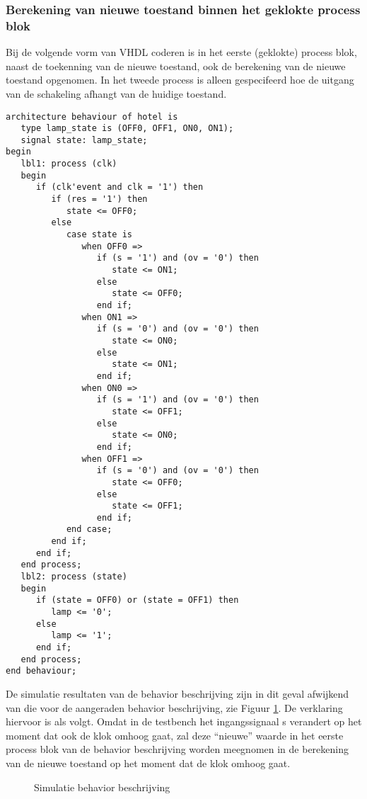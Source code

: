 \subsubsection{Berekening van nieuwe toestand binnen het geklokte process blok}
Bij de volgende vorm van VHDL coderen is in het eerste (geklokte) process blok,
naast de toekenning van de nieuwe toestand, ook de berekening 
van de nieuwe toestand opgenomen.
In het tweede process is alleen gespecifeerd hoe de uitgang
van de schakeling afhangt van de huidige toestand.
\begin{small}
\begin{verbatim}
architecture behaviour of hotel is
   type lamp_state is (OFF0, OFF1, ON0, ON1);
   signal state: lamp_state;
begin
   lbl1: process (clk)
   begin
      if (clk'event and clk = '1') then
         if (res = '1') then
            state <= OFF0;
         else 
            case state is
               when OFF0 =>
                  if (s = '1') and (ov = '0') then
                     state <= ON1; 
                  else
                     state <= OFF0; 
                  end if;
               when ON1 =>
                  if (s = '0') and (ov = '0') then
                     state <= ON0;
                  else
                     state <= ON1;
                  end if;
               when ON0 =>
                  if (s = '1') and (ov = '0') then
                     state <= OFF1; 
                  else
                     state <= ON0; 
                  end if;
               when OFF1 =>
                  if (s = '0') and (ov = '0') then
                     state <= OFF0;
                  else
                     state <= OFF1;
                  end if;
            end case;
         end if;
      end if;
   end process;
   lbl2: process (state) 
   begin
      if (state = OFF0) or (state = OFF1) then
         lamp <= '0';
      else 
         lamp <= '1';
      end if;
   end process;
end behaviour;
\end{verbatim}
\end{small}
De simulatie resultaten van de behavior beschrijving 
zijn in dit geval afwijkend van die voor de
aangeraden behavior beschrijving, zie Figuur \ref{figuur:vhdlsim2}.
De verklaring hiervoor is als volgt.
Omdat in de testbench het ingangssignaal s verandert op het 
moment dat ook de klok omhoog gaat, zal deze ``nieuwe''
waarde in het eerste process blok van de behavior beschrijving 
worden meegnomen in de berekening van de nieuwe toestand
op het moment dat de klok omhoog gaat. 
\begin{figure}[bth]
\centerline{}
\caption{Simulatie behavior beschrijving}
\label{figuur:vhdlsim2}
\end{figure}

